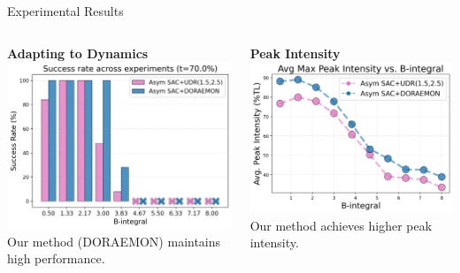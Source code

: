 \documentclass{beamer}
\begin{document}
\begin{frame}{Experimental Results}
\begin{columns}[T,totalwidth=\textwidth]
    \begin{column}{0.5\textwidth}
        \centering
        \textbf{Adapting to Dynamics}
        \includegraphics[width=\linewidth]{images/doraemon_vs_udr_succ_rate_70.png}
        Our method (DORAEMON) maintains high performance.
    \end{column}
    \begin{column}{0.5\textwidth}
        \centering
        \textbf{Peak Intensity}
        \includegraphics[width=\linewidth]{images/udr_vs_doraemon_average.png}
        Our method achieves higher peak intensity.
    \end{column}
\end{columns}
\end{frame}
\end{document}
